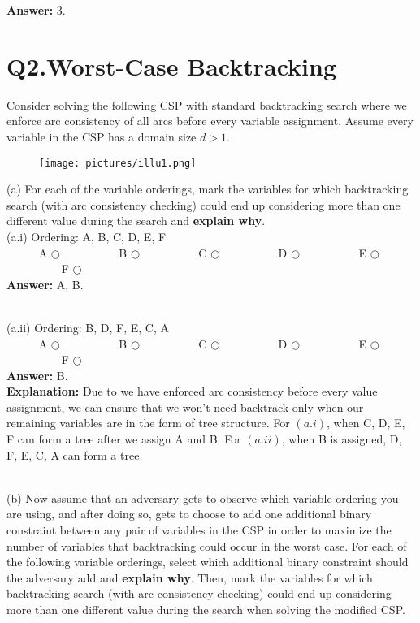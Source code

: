 \documentclass{article}
\begin{document}
\textbf{Answer:} 3.

\newpage
\section{Q2.Worst-Case Backtracking}
Consider solving the following CSP with standard backtracking search where we enforce arc consistency of all arcs before every variable assignment. Assume every variable in the CSP has a domain size $d > 1$.
\begin{figure}[h]
\centering
\texttt{[image: pictures/illu1.png]}
\end{figure}

\noindent (a) For each of the variable orderings, mark the variables for which backtracking search (with arc consistency checking) could end up considering more than one different value during the search and \textbf{explain why}.\\


\noindent (a.i) Ordering: A, B, C, D, E, F \\
\indent ~~~~~ A $\bigcirc$ ~~~~~~~~~  B $\bigcirc$ ~~~~~~~~~  C $\bigcirc$ ~~~~~~~~~  D $\bigcirc$ ~~~~~~~~~  E $\bigcirc$~~~~~~~~~  F $\bigcirc$ \\

\textbf{Answer:} A, B.

~\\

\noindent (a.ii) Ordering: B, D, F, E, C, A \\
\indent ~~~~~ A $\bigcirc$ ~~~~~~~~~  B $\bigcirc$ ~~~~~~~~~  C $\bigcirc$ ~~~~~~~~~  D $\bigcirc$ ~~~~~~~~~  E $\bigcirc$~~~~~~~~~  F $\bigcirc$ \\

\textbf{Answer:} B.  \\

\textbf{Explanation:} Due to we have enforced arc consistency before every value assignment, we can ensure that we won’t need backtrack only when our remaining variables are in the form of tree structure. For $(a.i)$, when C, D, E, F can form a tree after we assign A and B. For $(a.ii)$, when B is assigned, D, F, E, C, A can form a tree.

~\\

\noindent (b) Now assume that an adversary gets to observe which variable ordering you are using, and after doing so, gets to choose to add one additional binary constraint between any pair of variables in the CSP in order to maximize the number of variables that backtracking could occur in the worst case. For each of the following variable orderings, select which additional binary constraint should the adversary add and \textbf{explain why}. Then, mark the variables for which backtracking search (with arc consistency checking) could end up considering more than one different value during the search when solving the modified CSP. \\
\end{document}
